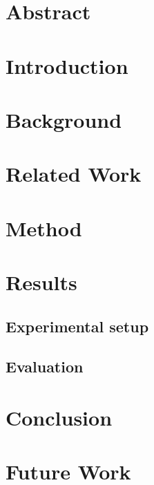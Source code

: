 \documentclass[a4paper, 12pt]{article}
\begin{document}


\setcounter{page}{2}
\tableofcontents
\newpage


\section*{Abstract}


\section{Introduction}
\section{Background}
\section{Related Work}
\section{Method}


\section{Results}
\subsection{Experimental setup}
\subsection{Evaluation}
\section{Conclusion}
\section{Future Work}

\printbibliography
\end{document}
